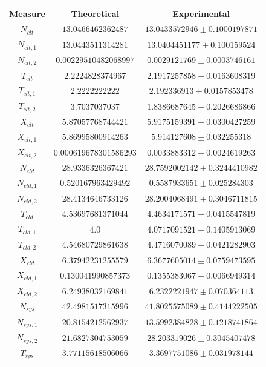 \begin{figure}
	\begin{center}
		\begin{tabular}{|c||c|c|}
\hline
Measure & Theoretical & Experimental \\
\hline
$N_{clt}$  & $13.0466462362487$ & $13.0433572946\pm 0.1000197871$ \\ 
$N_{clt,1}$  & $13.0443511314281$ & $13.0404451177\pm 0.100159524$ \\ 
$N_{clt,2}$  & $0.00229510482068997$ & $0.0029121769\pm 0.0003746161$ \\ 
$T_{clt}$  & $2.2224828374967$ & $2.1917257858\pm 0.0163608319$ \\ 
$T_{clt,1}$  & $2.2222222222$ & $2.192336913\pm 0.0157853478$ \\ 
$T_{clt,2}$  & $3.7037037037$ & $1.8386687645\pm 0.2026686866$ \\ 
$X_{clt}$  & $5.87057768744421$ & $5.9175159391\pm 0.0300427259$ \\ 
$X_{clt,1}$  & $5.86995800914263$ & $5.914127608\pm 0.032255318$ \\ 
$X_{clt,2}$  & $0.000619678301586293$ & $0.0033883312\pm 0.0024619263$ \\ 
\hline 
$N_{cld}$  & $28.9336326367421$ & $28.7592002142\pm 0.3244410982$ \\ 
$N_{cld,1}$  & $0.520167963429492$ & $0.5587933651\pm 0.025284303$ \\ 
$N_{cld,2}$  & $28.4134646733126$ & $28.2004068491\pm 0.3046711815$ \\ 
$T_{cld}$  & $4.53697681371044$ & $4.4634171571\pm 0.0415547819$ \\ 
$T_{cld,1}$  & $4.0$ & $4.0717091521\pm 0.1405913069$ \\ 
$T_{cld,2}$  & $4.54680729861638$ & $4.4716070089\pm 0.0421282903$ \\ 
$X_{cld}$  & $6.37942231255579$ & $6.3677605014\pm 0.0759473595$ \\ 
$X_{cld,1}$  & $0.130041990857373$ & $0.1355383067\pm 0.0066949314$ \\ 
$X_{cld,2}$  & $6.24938032169841$ & $6.2322221947\pm 0.070364113$ \\ 
\hline 
$N_{sys}$  & $42.4981517315996$ & $41.8025575089\pm 0.4144222505$ \\ 
$N_{sys,1}$  & $20.8154212562937$ & $13.5992384828\pm 0.1218741864$ \\ 
$N_{sys,2}$  & $21.6827304753059$ & $28.203319026\pm 0.3045407478$ \\ 
$T_{sys}$  & $3.77115618506066$ & $3.3697751086\pm 0.031978144$ \\ 

\end{tabular}
\end{center}
\end{figure}
